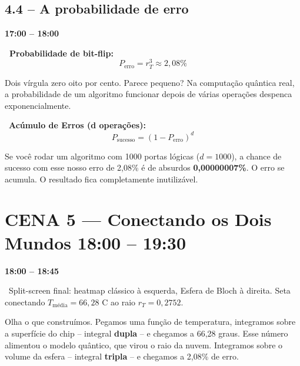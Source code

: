 \documentclass[12pt, a4paper]{article}
\newcommand{\tempo}[1]{%
  \noindent\hfill
  {\small\sffamily\color{corTempo}%
   \faStopwatch\enspace\textbf{#1}}%
  \par\vspace{2pt}%
}
\begin{document}
\subsection{4.4 -- A probabilidade de erro}
\tempo{17:00 -- 18:00}

\begin{mathblock}
\textbf{\color{corMath}\faSuperscript\ Probabilidade de bit-flip:}
\[
  P_{\text{erro}} = r_T^3 \approx 2{,}08\%
\]
\end{mathblock}

\begin{fala}
Dois vírgula zero oito por cento. Parece pequeno? Na computação quântica real, a probabilidade de um algoritmo funcionar depois de várias operações despenca exponencialmente.
\end{fala}

\begin{tela}
\faDesktop\ \textbf{Acúmulo de Erros (d operações):}
\[ P_{\text{sucesso}} = (1 - P_{\text{erro}})^d \]
\end{tela}

\begin{fala}
Se você rodar um algoritmo com 1000 portas lógicas ($d = 1000$), a chance de sucesso com esse nosso erro de 2,08\% é de absurdos \textbf{0,00000007\%}. O erro se acumula. O resultado fica completamente inutilizável.
\end{fala}

\section{CENA 5 --- Conectando os Dois Mundos \hfill \normalfont\small\color{corTempo}18:00 -- 19:30}

\tempo{18:00 -- 18:45}

\begin{visual}
\faFilm\ Split-screen final: heatmap clássico à esquerda, Esfera de Bloch à direita.
Seta conectando $T_{\text{média}} = 66{,}28$ {\textdegree}C ao raio $r_T = 0{,}2752$.
\end{visual}

\begin{fala}
Olha o que construímos. Pegamos uma função de temperatura, integramos sobre
a superfície do chip -- integral \textbf{dupla} -- e chegamos a 66,28 graus.
Esse número alimentou o modelo quântico, que virou o raio da nuvem.
Integramos sobre o volume da esfera -- integral \textbf{tripla} --
e chegamos a 2,08\% de erro.
\end{fala}
\end{document}
